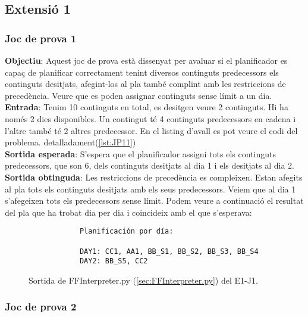 \documentclass[a4paper]{article}
\begin{document}
	
	\subsection{Extensió 1}
	
	
	\subsubsection*{Joc de prova 1}
	
	\noindent \textbf{Objectiu}: Aquest joc de prova està dissenyat per avaluar si el planificador es capaç de planificar correctament tenint diversos continguts predecessors els continguts desitjats, afegint-los al pla també complint amb les restriccions de precedència. Veure que es poden assignar continguts sense límit a un dia. \\
	
	\noindent \textbf{Entrada}: Tenim 10 continguts en total, es desitgen veure 2 continguts. Hi ha només 2 dies disponibles. Un contingut té 4 continguts predecessors en cadena i l'altre també té 2 altres predecessor. En el listing d'avall es pot veure el codi del problema.  detalladament(\ref{lst:JP11}) \\
	
	\noindent \textbf{Sortida esperada}: S'espera que el planificador assigni tots els continguts predecessors, que son 6, dels continguts desitjats al dia 1 i els desitjats al dia 2. \\
	
	\noindent \textbf{Sortida obtinguda}:  Les restriccions de  precedència es compleixen.  Estan afegits al pla tots els continguts desitjats amb els seus predecessors. Veiem que al dia 1 s'afegeixen tots els predecessors sense límit. Podem veure a continuació el resultat del pla que ha trobat dia per dia i coincideix amb el que s'esperava:
	
	\begin{figure}[H]
		\centering
		\begin{verbatim}
			Planificación por día:
			
			DAY1: CC1, AA1, BB_S1, BB_S2, BB_S3, BB_S4
			DAY2: BB_S5, CC2	
		\end{verbatim}
		\caption{Sortida de FFInterpreter.py (\ref{sec:FFInterpreter.py}) del E1-J1.}
	\end{figure}	
	
	\subsubsection*{Joc de prova 2}
	
\end{document}
